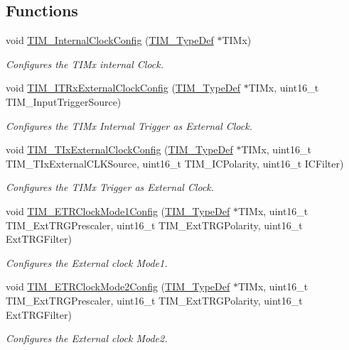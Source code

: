 \subsection*{Functions}
\begin{DoxyCompactItemize}
\item 
void \hyperlink{group___t_i_m___group6_ga2394f0221709c0659874f9a4184cf86e}{T\+I\+M\+\_\+\+Internal\+Clock\+Config} (\hyperlink{struct_t_i_m___type_def}{T\+I\+M\+\_\+\+Type\+Def} $\ast$T\+I\+Mx)
\begin{DoxyCompactList}\small\item\em Configures the T\+I\+Mx internal Clock. \end{DoxyCompactList}\item 
void \hyperlink{group___t_i_m___group6_gabef227d21d9e121e6a4ec5ab6223f5a9}{T\+I\+M\+\_\+\+I\+T\+Rx\+External\+Clock\+Config} (\hyperlink{struct_t_i_m___type_def}{T\+I\+M\+\_\+\+Type\+Def} $\ast$T\+I\+Mx, uint16\+\_\+t T\+I\+M\+\_\+\+Input\+Trigger\+Source)
\begin{DoxyCompactList}\small\item\em Configures the T\+I\+Mx Internal Trigger as External Clock. \end{DoxyCompactList}\item 
void \hyperlink{group___t_i_m___group6_gaf460e7d9c9969044e364130e209937fc}{T\+I\+M\+\_\+\+T\+Ix\+External\+Clock\+Config} (\hyperlink{struct_t_i_m___type_def}{T\+I\+M\+\_\+\+Type\+Def} $\ast$T\+I\+Mx, uint16\+\_\+t T\+I\+M\+\_\+\+T\+Ix\+External\+C\+L\+K\+Source, uint16\+\_\+t T\+I\+M\+\_\+\+I\+C\+Polarity, uint16\+\_\+t I\+C\+Filter)
\begin{DoxyCompactList}\small\item\em Configures the T\+I\+Mx Trigger as External Clock. \end{DoxyCompactList}\item 
void \hyperlink{group___t_i_m___group6_ga47c05638b93aabcd641dbc8859e1b2df}{T\+I\+M\+\_\+\+E\+T\+R\+Clock\+Mode1\+Config} (\hyperlink{struct_t_i_m___type_def}{T\+I\+M\+\_\+\+Type\+Def} $\ast$T\+I\+Mx, uint16\+\_\+t T\+I\+M\+\_\+\+Ext\+T\+R\+G\+Prescaler, uint16\+\_\+t T\+I\+M\+\_\+\+Ext\+T\+R\+G\+Polarity, uint16\+\_\+t Ext\+T\+R\+G\+Filter)
\begin{DoxyCompactList}\small\item\em Configures the External clock Mode1. \end{DoxyCompactList}\item 
void \hyperlink{group___t_i_m___group6_ga0a9cbcbab32326cbbdaf4c111f59ec20}{T\+I\+M\+\_\+\+E\+T\+R\+Clock\+Mode2\+Config} (\hyperlink{struct_t_i_m___type_def}{T\+I\+M\+\_\+\+Type\+Def} $\ast$T\+I\+Mx, uint16\+\_\+t T\+I\+M\+\_\+\+Ext\+T\+R\+G\+Prescaler, uint16\+\_\+t T\+I\+M\+\_\+\+Ext\+T\+R\+G\+Polarity, uint16\+\_\+t Ext\+T\+R\+G\+Filter)
\begin{DoxyCompactList}\small\item\em Configures the External clock Mode2. \end{DoxyCompactList}\end{DoxyCompactItemize}


